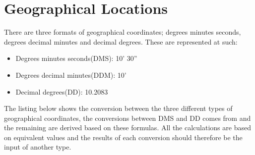 \section{Geographical Locations} \label{sec:geo_coordinates}
There are three formats of geographical coordinates; degrees minutes seconds, degrees decimal minutes and decimal degrees\cite{geo_types}. These are represented at such:
\begin{itemize}
	\item Degrees minutes seconds(DMS): 10' 30''
	\item Degrees decimal minutes(DDM): 10'
	\item Decimal degrees(DD): 10.2083\degree
\end{itemize}

The listing below shows the conversion between the three different types of geographical coordinates, the conversions between DMS and DD comes from\cite{geo_converter} and the remaining are derived based on these formulas. All the calculations are based on equivalent values and the results of each conversion should therefore be the input of another type.


